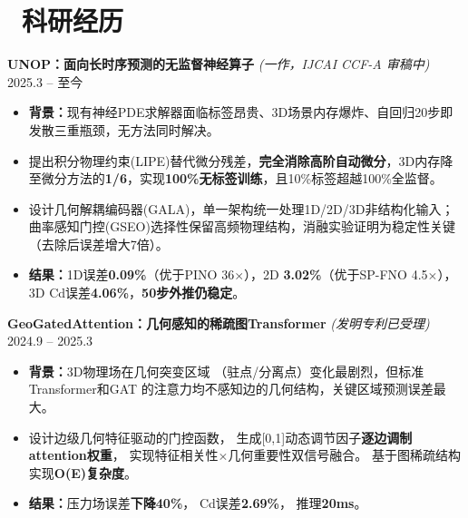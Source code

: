 \documentclass[11pt]{article}
\newlength{\interProjectSpacing}
\newcommand{\projectsep}{\vspace{\interProjectSpacing}}
\begin{document}
\section{\makebox[\widthof{\faUsers}][c]{\color{CVBlue}\faUsers}\ 
科研经历}

\textbf{UNOP：面向长时序预测的无监督神经算子} 
\textit{(一作，IJCAI CCF-A 审稿中)} 
\hfill 2025.3 -- 至今
\begin{itemize}
    \item \textbf{背景：}现有神经PDE求解器面临标签昂贵、3D场景内存爆炸、自回归20步即发散三重瓶颈，无方法同时解决。
    
    \item 提出积分物理约束(LIPE)替代微分残差，\textbf{完全消除高阶自动微分}，3D内存降至微分方法的\textbf{1/6}，实现\textbf{100\%无标签训练}，且10\%标签超越100\%全监督。
    
    \item 设计几何解耦编码器(GALA)，单一架构统一处理1D/2D/3D非结构化输入；曲率感知门控(GSEO)选择性保留高频物理结构，消融实验证明为稳定性关键（去除后误差增大7倍）。
    
    \item \textbf{结果：}1D误差\textbf{0.09\%}（优于PINO 36$\times$），2D \textbf{3.02\%}（优于SP-FNO 4.5$\times$），3D Cd误差\textbf{4.06\%}，\textbf{50步外推仍稳定}。
\end{itemize}


\textbf{GeoGatedAttention：几何感知的稀疏图Transformer} 
\textit{(发明专利已受理)} \hfill 2024.9 -- 2025.3
\begin{itemize}
    \item \textbf{背景：}3D物理场在几何突变区域
    （驻点/分离点）变化最剧烈，但标准Transformer和GAT
    的注意力均不感知边的几何结构，关键区域预测误差最大。
    
    \item 设计边级几何特征驱动的门控函数，
    生成[0,1]动态调节因子\textbf{逐边调制attention权重}，
    实现特征相关性$\times$几何重要性双信号融合。
    基于图稀疏结构实现\textbf{O(E)复杂度}。
    
    \item \textbf{结果：}压力场误差\textbf{下降40\%}，
    Cd误差\textbf{2.69\%}，
    推理\textbf{20ms}。
\end{itemize}
\end{document}
